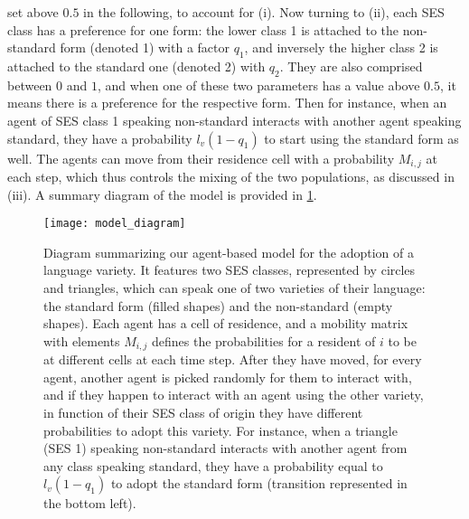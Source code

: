 \documentclass[../thesis.tex]{subfiles}
\begin{document}
set above $0.5$ in the following, to account for (i). Now turning to (ii), each \ac{SES}
class has a preference for one form: the lower class 1 is attached to the non-standard
form (denoted 1) with a factor $q_1$, and inversely the higher class 2 is attached to
the standard one (denoted 2) with $q_2$. They are also comprised between $0$ and $1$,
and when one of these two parameters has a value above $0.5$, it means there is a
preference for the respective form. Then for instance, when an agent of \ac{SES} class 1
speaking non-standard interacts with another agent speaking standard, they have a
probability $l_v (1 - q_1)$ to start using the standard form as well. The agents can
move from their residence cell with a probability $M_{i,j}$ at each step, which thus
controls the mixing of the two populations, as discussed in (iii). A summary diagram of
the model is provided in \cref{fig:ses_ling_model_diagram}.
\begin{figure}
\centering
  \texttt{[image: model\_diagram]}
  \caption{Diagram summarizing our agent-based model for the adoption of a language
  variety. It features two \ac{SES} classes, represented by circles and triangles, which
  can speak one of two varieties of their language: the standard form (filled shapes)
  and the non-standard (empty shapes). Each agent has a cell of residence, and a
  mobility matrix with elements $M_{i, j}$ defines the probabilities for a resident of
  $i$ to be at different cells at each time step. After they have moved, for every
  agent, another agent is picked randomly for them to interact with, and if they happen
  to interact with an agent using the other variety, in function of their \ac{SES} class
  of origin they have different probabilities to adopt this variety. For instance, when
  a triangle (\ac{SES} 1) speaking non-standard interacts with another agent from any class speaking
  standard, they have a probability equal to $l_v (1 - q_1)$ to adopt the standard form
  (transition represented in the bottom left).}
  \label{fig:ses_ling_model_diagram}
\end{figure}
\end{document}
